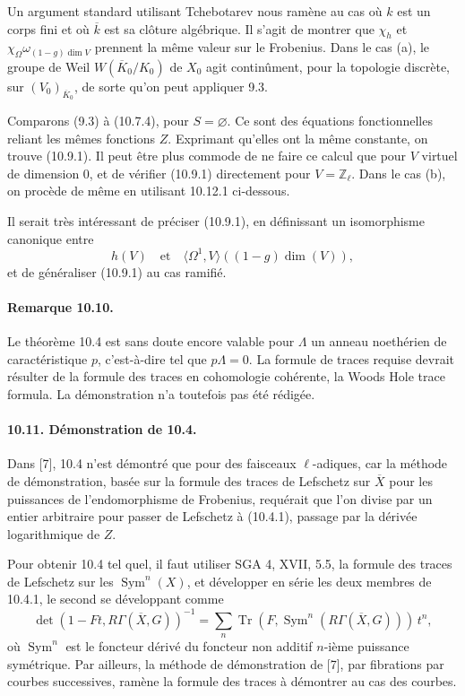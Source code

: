 \documentclass[10pt,letterpaper]{article}
\newcommand{\Z}{\mathbb Z}
\newcommand{\Tr}{\operatorname{Tr}}
\providecommand{\Tr}{\operatorname{Tr}}
\providecommand{\Tr}{\operatorname{Tr}}
\providecommand{\Sym}{\operatorname{Sym}}
\providecommand{\Tr}{\operatorname{Tr}}
\begin{document}
Un argument standard utilisant Tchebotarev nous ramène au cas où \(k\) est un corps fini et où \(\overline k\) est sa clôture algébrique. Il s'agit de montrer que \(\chi_h\) et \(\chi_{\Omega}\omega_{(1-g)\dim V}\) prennent la même valeur sur le Frobenius. Dans le cas (a), le groupe de Weil \(W(\overline K_0/K_0)\) de \(X_0\) agit continûment, pour la topologie discrète, sur \((V_0)_{\overline K_0}\), de sorte qu'on peut appliquer 9.3.

Comparons (9.3) à (10.7.4), pour \(S=\varnothing\). Ce sont des équations fonctionnelles reliant les mêmes fonctions \(Z\). Exprimant qu'elles ont la même constante, on trouve (10.9.1). Il peut être plus commode de ne faire ce calcul que pour \(V\) virtuel de dimension \(0\), et de vérifier (10.9.1) directement pour \(V=\Z_\ell\). Dans le cas (b), on procède de même en utilisant 10.12.1 ci-dessous.

Il serait très intéressant de préciser (10.9.1), en définissant un isomorphisme canonique entre
\[
h(V)
\quad\text{et}\quad
\langle\Omega^1,V\rangle((1-g)\dim(V)),
\]
et de généraliser (10.9.1) au cas ramifié.

\paragraph{Remarque 10.10.} Le théorème 10.4 est sans doute encore valable pour \(\Lambda\) un anneau noethérien de caractéristique \(p\), c'est-à-dire tel que \(p\Lambda=0\). La formule de traces requise devrait résulter de la formule des traces en cohomologie cohérente, la Woods Hole trace formula. La démonstration n'a toutefois pas été rédigée.

\paragraph{10.11. Démonstration de 10.4.} Dans [7], 10.4 n'est démontré que pour des faisceaux \(\ell\)-adiques, car la méthode de démonstration, basée sur la formule des traces de Lefschetz sur \(\overline X\) pour les puissances de l'endomorphisme de Frobenius, requérait que l'on divise par un entier arbitraire pour passer de Lefschetz à (10.4.1), passage par la dérivée logarithmique de \(Z\).

Pour obtenir 10.4 tel quel, il faut utiliser SGA 4, XVII, 5.5, la formule des traces de Lefschetz sur les \(\Sym^n(X)\), et développer en série les deux membres de 10.4.1, le second se développant comme
\[
\det(1-Ft,R\Gamma(\overline X,G))^{-1}
=
\sum_n \Tr(F,\Sym^n(R\Gamma(\overline X,G)))\,t^n,
\]
où \(\Sym^n\) est le foncteur dérivé du foncteur non additif \(n\)-ième puissance symétrique. Par ailleurs, la méthode de démonstration de [7], par fibrations par courbes successives, ramène la formule des traces à démontrer au cas des courbes.
\end{document}
